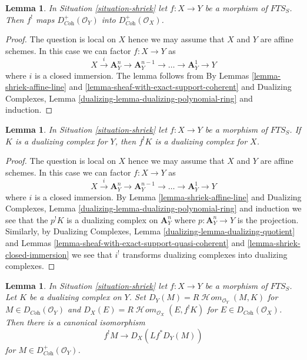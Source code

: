 \documentclass{stacks-project}
\theoremstyle{plain}
\newtheorem{lemma}[subsection]{Lemma}
\theoremstyle{definition}
\theoremstyle{remark}
\numberwithin{equation}{subsection}
\def\SheafHom{\mathop{\mathcal{H}\!\mathit{om}}\nolimits}
\begin{document}
\begin{lemma}
\label{lemma-shriek-coherent}
In Situation \ref{situation-shriek} let $f : X \to Y$ be a morphism of
$\textit{FTS}_S$. Then $f^!$ maps
$D_{\textit{Coh}}^+(\mathcal{O}_Y)$ into $D_{\textit{Coh}}^+(\mathcal{O}_X)$.
\end{lemma}

\begin{proof}
The question is local on $X$ hence we may assume that $X$ and $Y$ are
affine schemes. In this case we can factor $f : X \to Y$ as
$$
X \xrightarrow{i} \mathbf{A}^n_Y \to \mathbf{A}^{n - 1}_Y \to \ldots \to
\mathbf{A}^1_Y \to Y
$$
where $i$ is a closed immersion. The lemma follows from
By Lemmas \ref{lemma-shriek-affine-line} and
\ref{lemma-sheaf-with-exact-support-coherent} and
Dualizing Complexes, Lemma
\ref{dualizing-lemma-dualizing-polynomial-ring}
and induction.
\end{proof}

\begin{lemma}
\label{lemma-shriek-dualizing}
In Situation \ref{situation-shriek} let $f : X \to Y$ be a morphism of
$\textit{FTS}_S$. If $K$ is a dualizing complex
for $Y$, then $f^!K$ is a dualizing complex for $X$.
\end{lemma}

\begin{proof}
The question is local on $X$ hence we may assume that $X$ and $Y$ are
affine schemes. In this case we can factor $f : X \to Y$ as
$$
X \xrightarrow{i} \mathbf{A}^n_Y \to \mathbf{A}^{n - 1}_Y \to \ldots \to
\mathbf{A}^1_Y \to Y
$$
where $i$ is a closed immersion. By Lemma \ref{lemma-shriek-affine-line} and
Dualizing Complexes, Lemma \ref{dualizing-lemma-dualizing-polynomial-ring}
and induction we see that
the $p^!K$ is a dualizing complex on $\mathbf{A}^n_Y$ where
$p : \mathbf{A}^n_Y \to Y$ is the projection. Similarly, by
Dualizing Complexes, Lemma \ref{dualizing-lemma-dualizing-quotient}
and Lemmas
\ref{lemma-sheaf-with-exact-support-quasi-coherent} and
\ref{lemma-shriek-closed-immersion} we see that $i^!$
transforms dualizing complexes into dualizing complexes.
\end{proof}

\begin{lemma}
\label{lemma-shriek-via-duality}
In Situation \ref{situation-shriek} let $f : X \to Y$ be a morphism of
$\textit{FTS}_S$. Let $K$ be a dualizing complex
on $Y$. Set $D_Y(M) = R\SheafHom_{\mathcal{O}_Y}(M, K)$ for
$M \in D_{\textit{Coh}}(\mathcal{O}_Y)$ and
$D_X(E) = R\SheafHom_{\mathcal{O}_X}(E, f^!K)$ for
$E \in D_{\textit{Coh}}(\mathcal{O}_X)$. Then there is a canonical
isomorphism
$$
f^!M \longrightarrow D_X(Lf^*D_Y(M))
$$
for $M \in D_{\textit{Coh}}^+(\mathcal{O}_Y)$.
\end{lemma}
\end{document}
